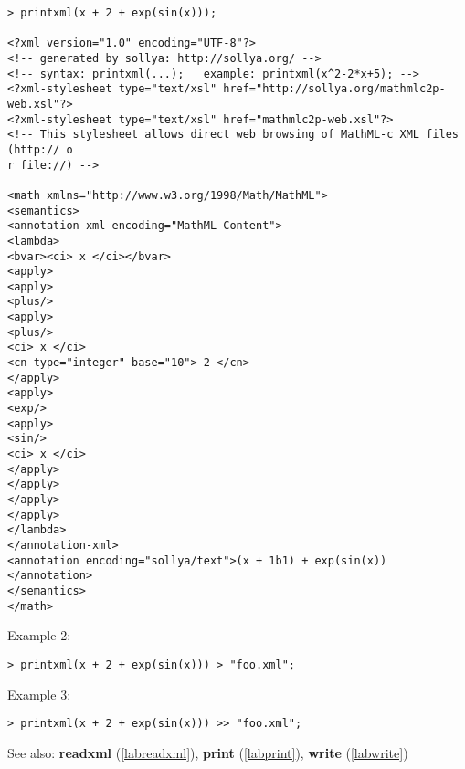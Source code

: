 \begin{center}\begin{minipage}{15cm}\begin{Verbatim}[frame=single]
> printxml(x + 2 + exp(sin(x)));

<?xml version="1.0" encoding="UTF-8"?>
<!-- generated by sollya: http://sollya.org/ -->
<!-- syntax: printxml(...);   example: printxml(x^2-2*x+5); -->
<?xml-stylesheet type="text/xsl" href="http://sollya.org/mathmlc2p-web.xsl"?>
<?xml-stylesheet type="text/xsl" href="mathmlc2p-web.xsl"?>
<!-- This stylesheet allows direct web browsing of MathML-c XML files (http:// o
r file://) -->

<math xmlns="http://www.w3.org/1998/Math/MathML">
<semantics>
<annotation-xml encoding="MathML-Content">
<lambda>
<bvar><ci> x </ci></bvar>
<apply>
<apply>
<plus/>
<apply>
<plus/>
<ci> x </ci>
<cn type="integer" base="10"> 2 </cn>
</apply>
<apply>
<exp/>
<apply>
<sin/>
<ci> x </ci>
</apply>
</apply>
</apply>
</apply>
</lambda>
</annotation-xml>
<annotation encoding="sollya/text">(x + 1b1) + exp(sin(x))</annotation>
</semantics>
</math>

\end{Verbatim}
\end{minipage}\end{center}
\noindent Example 2: 
\begin{center}\begin{minipage}{15cm}\begin{Verbatim}[frame=single]
> printxml(x + 2 + exp(sin(x))) > "foo.xml";
\end{Verbatim}
\end{minipage}\end{center}
\noindent Example 3: 
\begin{center}\begin{minipage}{15cm}\begin{Verbatim}[frame=single]
> printxml(x + 2 + exp(sin(x))) >> "foo.xml";
\end{Verbatim}
\end{minipage}\end{center}
See also: \textbf{readxml} (\ref{labreadxml}), \textbf{print} (\ref{labprint}), \textbf{write} (\ref{labwrite})
